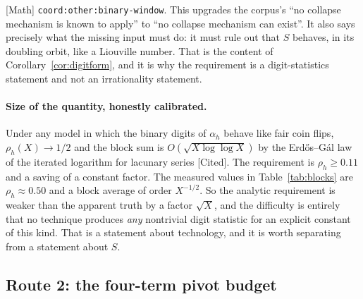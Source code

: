 \documentclass[11pt]{article}
\theoremstyle{plain}
\theoremstyle{definition}
\theoremstyle{remark}
\newcommand{\ev}[1]{{\small\textsf{[#1]}}\xspace}
\newcommand{\scale}[1]{{\small\textsf{scale:#1}}\xspace}
\newcommand{\coord}[1]{\texorpdfstring{{\small\nolinkurl{coord:#1}}}{coord:#1}\xspace}
\begin{document}
\noindent
\ev{Math} \quad \scale{cofinal} \quad \coord{other:binary-window}. This
upgrades the corpus's ``no collapse mechanism is known to apply'' to ``no
collapse mechanism can exist''. It also says precisely what the missing
input must do: it must rule out that $S$ behaves, in its doubling orbit,
like a Liouville number. That is the content of Corollary~\ref{cor:digitform},
and it is why the requirement is a digit-statistics statement and not an
irrationality statement.

\paragraph{Size of the quantity, honestly calibrated.}
Under any model in which the binary digits of $\alpha_h$ behave like fair
coin flips, $\rho_h(X)\to 1/2$ and the block sum is $O(\sqrt{X\log\log X})$
by the Erd\H{o}s--G\'al law of the iterated logarithm for lacunary series
\ev{Cited}. The requirement is $\rho_h\ge 0.11$ and a saving of a constant
factor. The measured values in Table~\ref{tab:blocks} are $\rho_h\approx 0.50$ and a block
average of order $X^{-1/2}$. So the analytic requirement is weaker than the
apparent truth by a factor $\sqrt X$, and the difficulty is entirely that no
technique produces \emph{any} nontrivial digit statistic for an explicit
constant of this kind. That is a statement about technology, and it is worth
separating from a statement about $S$.

\subsection{Route 2: the four-term pivot budget}\label{sub:pivot}
\end{document}
